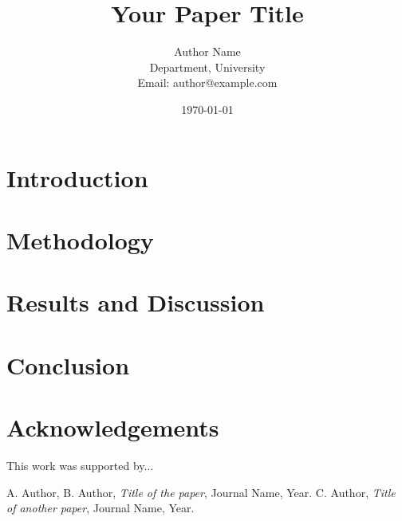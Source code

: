 \documentclass[twocolumn]{article}
\title{\textbf{Your Paper Title}}
\author{Author Name \\
\small Department, University \\
\small Email: author@example.com}
\date{\today}
\begin{document}
\maketitle

\begin{abstract}
\lipsum[1] %
\end{abstract}

\section{Introduction}
\lipsum[2-3] %

\section{Methodology}
\lipsum[4-5] %

\section{Results and Discussion}
\lipsum[6] %

\section{Conclusion}
\lipsum[7] %

\section*{Acknowledgements}
This work was supported by...

\begin{thebibliography}{99}
 A. Author, B. Author, \textit{Title of the paper}, Journal Name, Year.
 C. Author, \textit{Title of another paper}, Journal Name, Year.
\end{thebibliography}
\end{document}

